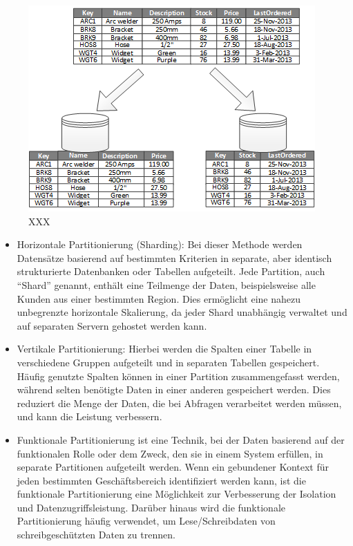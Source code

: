 \begin{figure}[t]
    \centering
    \includegraphics[width=\linewidth]{images/2}
    \caption{XXX}
    \label{fig:2}
\end{figure}

\begin{itemize}
    \item Horizontale Partitionierung (Sharding): Bei dieser Methode werden Datensätze basierend auf bestimmten Kriterien in separate, aber identisch strukturierte Datenbanken oder Tabellen aufgeteilt. Jede Partition, auch “Shard” genannt, enthält eine Teilmenge der Daten, beispielsweise alle Kunden aus einer bestimmten Region. Dies ermöglicht eine nahezu unbegrenzte horizontale Skalierung, da jeder Shard unabhängig verwaltet und auf separaten Servern gehostet werden kann.
    \item Vertikale Partitionierung: Hierbei werden die Spalten einer Tabelle in verschiedene Gruppen aufgeteilt und in separaten Tabellen gespeichert. Häufig genutzte Spalten können in einer Partition zusammengefasst werden, während selten benötigte Daten in einer anderen gespeichert werden. Dies reduziert die Menge der Daten, die bei Abfragen verarbeitet werden müssen, und kann die Leistung verbessern.
    \item Funktionale Partitionierung ist eine Technik, bei der Daten basierend auf der funktionalen Rolle oder dem Zweck, den sie in einem System erfüllen, in separate Partitionen aufgeteilt werden. Wenn ein gebundener Kontext für jeden bestimmten Geschäftsbereich identifiziert werden kann, ist die funktionale Partitionierung eine Möglichkeit zur Verbesserung der Isolation und Datenzugriffsleistung. Darüber hinaus wird die funktionale Partitionierung häufig verwendet, um Lese/Schreibdaten von schreibgeschützten Daten zu trennen.
\end{itemize}

